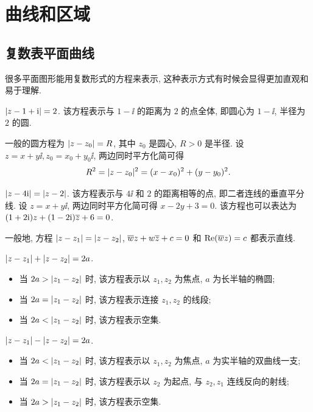 \section{曲线和区域}

\subsection{复数表平面曲线}

很多平面图形能用复数形式的方程来表示, 这种表示方式有时候会显得更加直观和易于理解.


\begin{exampleenum}
  \item $\lvert z-1+\mathrm{i}\rvert=2$. 该方程表示与 $1-\ii$ 的距离为 $2$ 的点全体, 即圆心为 $1-\ii$, 半径为 $2$ 的圆.
  
  一般的圆方程为 $\lvert z-z_0\rvert=R$, 其中 $z_0$ 是圆心, $R>0$ 是半径.
  设 $z=x+y\ii,z_0=x_0+y_0\ii$, 两边同时平方化简可得
  \[
    R^2=\lvert z-z_0\rvert^2=(x-x_0)^2+(y-y_0)^2.
  \]
  \item $\lvert z-4\mathrm{i}\rvert=\lvert z-2\rvert$. 该方程表示与 $4\ii$ 和 $2$ 的距离相等的点, 即二者连线的垂直平分线.
  设 $z=x+y\ii$, 两边同时平方化简可得 $x-2y+3=0$.
  该方程也可以表达为 $(1+2\mathrm{i})z+(1-2\mathrm{i})\overline z+6=0$.

  一般地, 方程 $\lvert z-z_1\rvert=\lvert z-z_2\rvert$, $\overline w z+w\overline z+c=0$ 和 $\operatorname{Re}(\overline wz)=c$ 都表示直线.
  \item $\lvert z-z_1\rvert+\lvert z-z_2\rvert=2a$.
  \begin{itemize}
    \item 当 $2a>\lvert z_1-z_2\rvert$ 时, 该方程表示以 $z_1,z_2$ 为焦点, $a$ 为长半轴的椭圆;
    \item 当 $2a=\lvert z_1-z_2\rvert$ 时, 该方程表示连接 $z_1,z_2$ 的线段;
    \item 当 $2a<\lvert z_1-z_2\rvert$ 时, 该方程表示空集.
  \end{itemize}
  \item $\lvert z-z_1\rvert-\lvert z-z_2\rvert=2a$.
  \begin{itemize}
    \item 当 $2a<\lvert z_1-z_2\rvert$ 时, 该方程表示以 $z_1,z_2$ 为焦点, $a$ 为实半轴的双曲线一支;
    \item 当 $2a=\lvert z_1-z_2\rvert$ 时, 该方程表示以 $z_2$ 为起点, 与 $z_2,z_1$ 连线反向的射线;
    \item 当 $2a>\lvert z_1-z_2\rvert$ 时, 该方程表示空集.
  \end{itemize}
\end{exampleenum}

